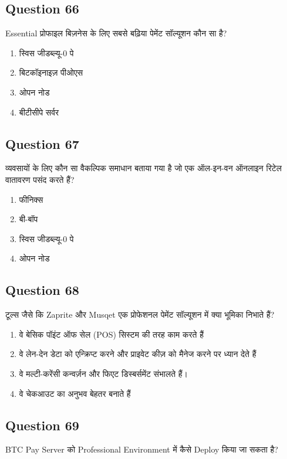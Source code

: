 \documentclass[12pt,a4paper]{article}
\begin{document}
\bigskip


\subsection*{Question 66}
Essential प्रोफाइल बिज़नेस के लिए सबसे बढ़िया पेमेंट सॉल्यूशन कौन सा है?

\begin{enumerate}[label=\Alph*., leftmargin=*]
\item स्विस जीडब्ल्यू-0 पे
\item बिटकॉइनाइज़ पीओएस
\item ओपन नोड
\item बीटीसीपे सर्वर
\end{enumerate}

\bigskip


\subsection*{Question 67}
व्यवसायों के लिए कौन सा वैकल्पिक समाधान बताया गया है जो एक ऑल-इन-वन ऑनलाइन रिटेल वातावरण पसंद करते हैं?

\begin{enumerate}[label=\Alph*., leftmargin=*]
\item फीनिक्स
\item बी-बॉप
\item स्विस जीडब्ल्यू-0 पे
\item ओपन नोड
\end{enumerate}

\bigskip


\subsection*{Question 68}
टूल्स जैसे कि Zaprite और Musqet एक प्रोफेशनल पेमेंट सॉल्यूशन में क्या भूमिका निभाते हैं?

\begin{enumerate}[label=\Alph*., leftmargin=*]
\item वे बेसिक पॉइंट ऑफ सेल (POS) सिस्टम की तरह काम करते हैं
\item वे लेन-देन डेटा को एन्क्रिप्ट करने और प्राइवेट कीज़ को मैनेज करने पर ध्यान देते हैं
\item वे मल्टी-करेंसी कन्वर्ज़न और फिएट डिस्बर्समेंट संभालते हैं।
\item वे चेकआउट का अनुभव बेहतर बनाते हैं
\end{enumerate}

\bigskip


\subsection*{Question 69}
BTC Pay Server को Professional Environment में कैसे Deploy किया जा सकता है?
\end{document}
